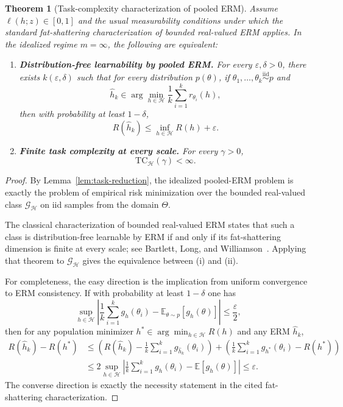 \documentclass[11pt]{article}
\newtheorem{theorem}{Theorem}
\theoremstyle{definition}
\newcommand{\E}{\mathbb{E}}
\begin{document}
\begin{theorem}[Task-complexity characterization of pooled ERM]
\label{thm:task-complexity-iff}
Assume $\ell(h;z) \in [0,1]$ and the usual measurability conditions under which the standard fat-shattering characterization of bounded real-valued ERM applies. In the idealized regime $m=\infty$, the following are equivalent:
\begin{enumerate}[label=(\roman*)]
\item \textbf{Distribution-free learnability by pooled ERM.} For every $\varepsilon,\delta > 0$, there exists $k(\varepsilon,\delta)$ such that for every distribution $p(\theta)$, if $\theta_1,\dots,\theta_k \overset{\mathrm{iid}}{\sim} p$ and
\[
\widehat{h}_k \in \arg\min_{h \in \mathcal{H}} \frac{1}{k}\sum_{i=1}^k r_{\theta_i}(h),
\]
then with probability at least $1-\delta$,
\[
R(\widehat{h}_k) \le \inf_{h \in \mathcal{H}} R(h) + \varepsilon.
\]

\item \textbf{Finite task complexity at every scale.} For every $\gamma > 0$,
\[
\mathrm{TC}_{\mathcal{H}}(\gamma) < \infty.
\]
\end{enumerate}
\end{theorem}

\begin{proof}
By Lemma~\ref{lem:task-reduction}, the idealized pooled-ERM problem is exactly the problem of empirical risk minimization over the bounded real-valued class $\mathcal{G}_{\mathcal{H}}$ on iid samples from the domain $\Theta$.

The classical characterization of bounded real-valued ERM states that such a class is distribution-free learnable by ERM if and only if its fat-shattering dimension is finite at every scale; see Bartlett, Long, and Williamson~\cite{bartlett1996}. Applying that theorem to $\mathcal{G}_{\mathcal{H}}$ gives the equivalence between (i) and (ii).

For completeness, the easy direction is the implication from uniform convergence to ERM consistency. If with probability at least $1-\delta$ one has
\[
\sup_{h \in \mathcal{H}}
\left|
\frac{1}{k}\sum_{i=1}^k g_h(\theta_i) - \E_{\theta \sim p}[g_h(\theta)]
\right|
\le \frac{\varepsilon}{2},
\]
then for any population minimizer $h^* \in \arg\min_{h \in \mathcal{H}} R(h)$ and any ERM $\widehat{h}_k$,
\begin{align*}
R(\widehat{h}_k) - R(h^*)
&\le
\left(
R(\widehat{h}_k) - \frac{1}{k}\sum_{i=1}^k g_{\widehat{h}_k}(\theta_i)
\right)
+
\left(
\frac{1}{k}\sum_{i=1}^k g_{h^*}(\theta_i) - R(h^*)
\right) \\
&\le
2 \sup_{h \in \mathcal{H}}
\left|
\frac{1}{k}\sum_{i=1}^k g_h(\theta_i) - \E[g_h(\theta)]
\right|
\le \varepsilon.
\end{align*}
The converse direction is exactly the necessity statement in the cited fat-shattering characterization.
\end{proof}
\end{document}
